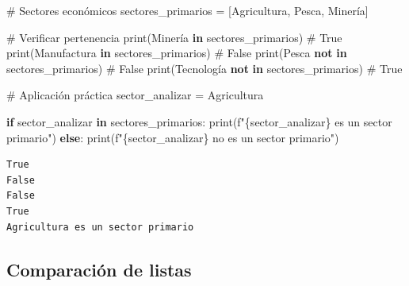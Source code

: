 \documentclass[
  doc,
  floatsintext,
  longtable,
  a4paper,
  nolmodern,
  notxfonts,
  notimes,
  12pt,
  colorlinks=true,linkcolor=blue,citecolor=blue,urlcolor=blue]{apa7}
\newenvironment{Shaded}{\begin{snugshade}}{\end{snugshade}}
\newcommand{\BuiltInTok}[1]{\textcolor[rgb]{0.00,0.23,0.31}{#1}}
\newcommand{\CommentTok}[1]{\textcolor[rgb]{0.37,0.37,0.37}{#1}}
\newcommand{\ControlFlowTok}[1]{\textcolor[rgb]{0.00,0.23,0.31}{\textbf{#1}}}
\newcommand{\KeywordTok}[1]{\textcolor[rgb]{0.00,0.23,0.31}{\textbf{#1}}}
\newcommand{\NormalTok}[1]{\textcolor[rgb]{0.00,0.23,0.31}{#1}}
\newcommand{\OperatorTok}[1]{\textcolor[rgb]{0.37,0.37,0.37}{#1}}
\newcommand{\SpecialCharTok}[1]{\textcolor[rgb]{0.37,0.37,0.37}{#1}}
\newcommand{\SpecialStringTok}[1]{\textcolor[rgb]{0.13,0.47,0.30}{#1}}
\newcommand{\StringTok}[1]{\textcolor[rgb]{0.13,0.47,0.30}{#1}}
\begin{document}
\begin{Shaded}
\begin{Highlighting}[]
\CommentTok{\# Sectores económicos}
\NormalTok{sectores\_primarios }\OperatorTok{=}\NormalTok{ [}\StringTok{\textquotesingle{}Agricultura\textquotesingle{}}\NormalTok{, }\StringTok{\textquotesingle{}Pesca\textquotesingle{}}\NormalTok{, }\StringTok{\textquotesingle{}Minería\textquotesingle{}}\NormalTok{]}

\CommentTok{\# Verificar pertenencia}
\BuiltInTok{print}\NormalTok{(}\StringTok{\textquotesingle{}Minería\textquotesingle{}} \KeywordTok{in}\NormalTok{ sectores\_primarios)        }\CommentTok{\# True}
\BuiltInTok{print}\NormalTok{(}\StringTok{\textquotesingle{}Manufactura\textquotesingle{}} \KeywordTok{in}\NormalTok{ sectores\_primarios)    }\CommentTok{\# False}
\BuiltInTok{print}\NormalTok{(}\StringTok{\textquotesingle{}Pesca\textquotesingle{}} \KeywordTok{not} \KeywordTok{in}\NormalTok{ sectores\_primarios)      }\CommentTok{\# False}
\BuiltInTok{print}\NormalTok{(}\StringTok{\textquotesingle{}Tecnología\textquotesingle{}} \KeywordTok{not} \KeywordTok{in}\NormalTok{ sectores\_primarios) }\CommentTok{\# True}

\CommentTok{\# Aplicación práctica}
\NormalTok{sector\_analizar }\OperatorTok{=} \StringTok{\textquotesingle{}Agricultura\textquotesingle{}}

\ControlFlowTok{if}\NormalTok{ sector\_analizar }\KeywordTok{in}\NormalTok{ sectores\_primarios:}
    \BuiltInTok{print}\NormalTok{(}\SpecialStringTok{f"}\SpecialCharTok{\{}\NormalTok{sector\_analizar}\SpecialCharTok{\}}\SpecialStringTok{ es un sector primario"}\NormalTok{)}
\ControlFlowTok{else}\NormalTok{:}
    \BuiltInTok{print}\NormalTok{(}\SpecialStringTok{f"}\SpecialCharTok{\{}\NormalTok{sector\_analizar}\SpecialCharTok{\}}\SpecialStringTok{ no es un sector primario"}\NormalTok{)}
\end{Highlighting}
\end{Shaded}

\begin{verbatim}
True
False
False
True
Agricultura es un sector primario
\end{verbatim}

\subsection{Comparación de listas}\label{comparaciuxf3n-de-listas}
\end{document}
